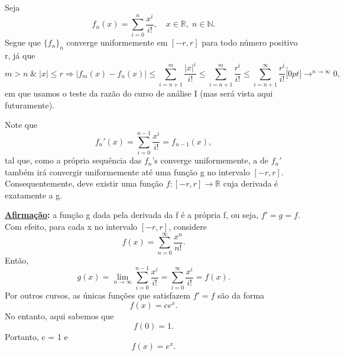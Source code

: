 \documentclass[../analysisII_notes.tex]{subfiles}
\begin{document}
\begin{example}
	Seja
	\[
		f_{n}(x) = \sum\limits_{i=0}^{n}\frac{x^{i}}{i!},\quad x\in \mathbb{R},\; n\in \mathbb{N}.
	\]
	Segue que \(\{f_{n}\}_{n}\) converge uniformemente em \([-r, r]\) para todo número positivo r, já que
	\[
		m > n\;\&\; |x|\leq r \Rightarrow |f_{m}(x)-f_{n}(x)|\leq \sum\limits_{i=n+1}^{m}\frac{|x|^{i}}{i!}\leq \sum\limits_{i=n+1}^{m}\frac{r^{i}}{i!}\leq \sum\limits_{i=n+1}^{\infty}\frac{r^{i}}{i!}\overbracket[0pt]{\longrightarrow}^{n\to \infty}0,
	\]
	em que usamos o teste da razão do curso de análise I (mas será vista aqui futuramente).

	Note que
	\[
		f_{n}'(x) = \sum\limits_{i=0}^{n-1}\frac{x^{i}}{i!} = f_{n-1}(x),
	\]
	tal que, como a própria sequência das \(f_{n}\)'s converge uniformemente, a de \(f_{n}'\) também irá convergir uniformemente até uma função g no intervalo \([-r, r]\). Consequentemente, deve existir uma função \(f:[-r, r]\rightarrow \mathbb{R}\) cuja derivada é exatamente a g.

	\textbf{\underline{Afirmação}:} a função g dada pela derivada da f é a própria f, ou seja, \(f'=g=f\).
	Com efeito, para cada x no intervalo \([-r, r]\), considere
	\[
		f(x) = \sum\limits_{n=0}^{\infty}\frac{x^{n}}{n!}.
	\]
	Então,
	\[
		g(x) = \lim_{n\to \infty}\sum\limits_{i=0}^{n-1}\frac{x^{i}}{i!} = \sum\limits_{i=0}^{\infty}\frac{x^{i}}{i!} = f(x).
	\]
	Por outros cursos, as únicas funções que satisfazem \(f'=f\) são da forma
	\[
		f(x) = ce^{x}.
	\]
	No entanto, aqui sabemos que
	\[
		f(0) = 1.
	\]
	Portanto, c = 1 e
	\[
		f(x) = e^{x}.
	\]
\end{example}
\end{document}

